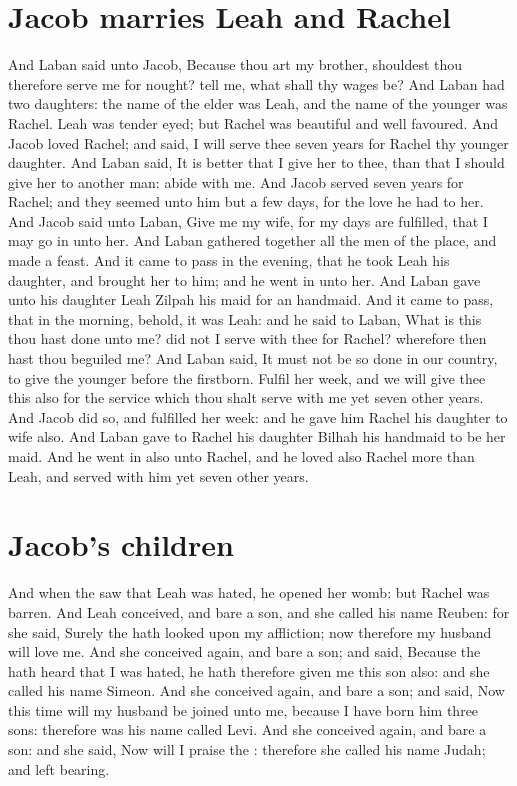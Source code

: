 \begin{biblechapter}
\section*{Jacob marries Leah and Rachel}
\verse And Laban said unto Jacob, Because thou art my brother, shouldest thou therefore serve me for nought? tell me, what shall thy wages be?
\verse And Laban had two daughters: the name of the elder was Leah, and the name of the younger was Rachel.
\verse Leah was tender eyed; but Rachel was beautiful and well favoured.
\verse And Jacob loved Rachel; and said, I will serve thee seven years for Rachel thy younger daughter.
\verse And Laban said, It is better that I give her to thee, than that I should give her to another man: abide with me.
\verse And Jacob served seven years for Rachel; and they seemed unto him but a few days, for the love he had to her.
\verse And Jacob said unto Laban, Give me my wife, for my days are fulfilled, that I may go in unto her.
\verse And Laban gathered together all the men of the place, and made a feast.
\verse And it came to pass in the evening, that he took Leah his daughter, and brought her to him; and he went in unto her.
\verse And Laban gave unto his daughter Leah Zilpah his maid for an handmaid.
\verse And it came to pass, that in the morning, behold, it was Leah: and he said to Laban, What is this thou hast done unto me? did not I serve with thee for Rachel? wherefore then hast thou beguiled me?
\verse And Laban said, It must not be so done in our country, to give the younger before the firstborn.
\verse Fulfil her week, and we will give thee this also for the service which thou shalt serve with me yet seven other years.
\verse And Jacob did so, and fulfilled her week: and he gave him Rachel his daughter to wife also.
\verse And Laban gave to Rachel his daughter Bilhah his handmaid to be her maid.
\verse And he went in also unto Rachel, and he loved also Rachel more than Leah, and served with him yet seven other years.
\section*{Jacob's children}
\verse And when the \LORD saw that Leah was hated, he opened her womb: but Rachel was barren.
\verse And Leah conceived, and bare a son, and she called his name Reuben: for she said, Surely the \LORD hath looked upon my affliction; now therefore my husband will love me.
\verse And she conceived again, and bare a son; and said, Because the \LORD hath heard that I was hated, he hath therefore given me this son also: and she called his name Simeon.
\verse And she conceived again, and bare a son; and said, Now this time will my husband be joined unto me, because I have born him three sons: therefore was his name called Levi.
\verse And she conceived again, and bare a son: and she said, Now will I praise the \LORD: therefore she called his name Judah; and left bearing.
\end{biblechapter}

